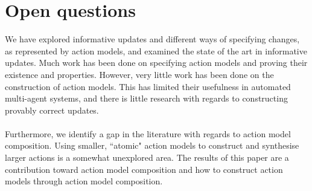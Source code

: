 \section{Open questions} \label{section:literatureReview:openQuestions}

We have explored informative updates and different ways of specifying changes, as represented by action models, and examined the state of the
art in informative updates.
Much work has been done on specifying action models and proving their existence and properties.
However, very little work has been done on the construction of action models.
This has limited their usefulness in automated multi-agent systems, and there is little research
with regards to constructing provably correct updates.\\
\\
Furthermore, we identify a gap in the literature with regards to action model composition.
Using smaller, ``atomic" action models to construct and synthesise larger actions is a somewhat
unexplored area.
The results of this paper are a contribution toward action model composition and how to construct
action models through action model composition.
